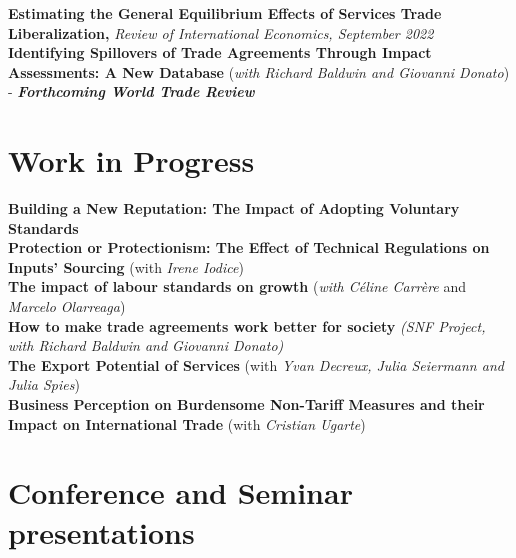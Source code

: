 \documentclass[a4paper,10pt]{article} %
\begin{document}
\vspace{5pt}


\textbf{Estimating the General Equilibrium Effects of Services Trade Liberalization,} \textit{ Review of International Economics, September 2022} \\ 

\textbf{Identifying Spillovers of Trade Agreements Through Impact Assessments: A New Database}  (\textit{with Richard Baldwin and Giovanni Donato}) - \textbf{\textit{Forthcoming World Trade Review}}\\ 


\section{\textcolor{bluegray}{Work in Progress}}

\vspace{5pt}


\textbf{Building a New Reputation: The Impact of Adopting Voluntary Standards} \\ 

\textbf{Protection or Protectionism: The Effect of Technical Regulations on Inputs' Sourcing} (with \textit{Irene Iodice}) \\

\textbf{The impact of labour standards on growth} (\textit{with Céline Carrère} and \textit{Marcelo Olarreaga}) \\

\textbf{How to make trade agreements work better for society} \textit{(SNF Project, with Richard Baldwin and Giovanni Donato)} \\


\textbf{The Export Potential of Services} (with \textit{Yvan Decreux, Julia Seiermann and Julia Spies}) \\


\textbf{Business Perception on Burdensome Non-Tariff Measures and their Impact on International Trade} (with \textit{Cristian Ugarte}) \\




\section{\textcolor{bluegray}{Conference and Seminar presentations}}
\end{document}
